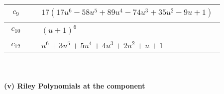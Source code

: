 \documentclass[1p]{elsarticle_modified}
\theoremstyle{definition}
\begin{document}
\begin{tabular}{m{50pt}|m{274pt}}
\hline $$\begin{aligned}c_{9}\end{aligned}$$&$\begin{aligned}
&17(17 u^6-58 u^5+89 u^4-74 u^3+35 u^2-9 u+1)
\end{aligned}$\\
\hline $$\begin{aligned}c_{10}\end{aligned}$$&$\begin{aligned}
&(u+1)^6
\end{aligned}$\\
\hline $$\begin{aligned}c_{12}\end{aligned}$$&$\begin{aligned}
&u^6+3 u^5+5 u^4+4 u^3+2 u^2+u+1
\end{aligned}$\\
\hline
\end{tabular}\\~\\
\newpage\renewcommand{\arraystretch}{1}
\flushleft \textbf{(v) Riley Polynomials at the component}\newline \\
\end{document}
